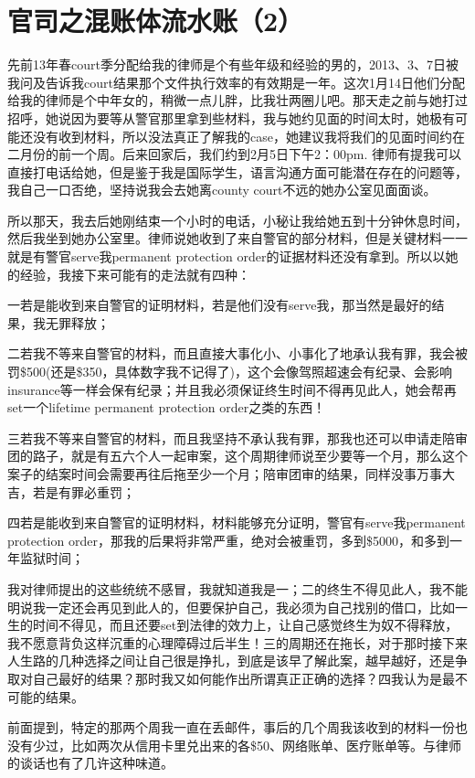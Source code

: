 \documentclass[12pt]{book}
\begin{document}
\section{官司之混账体流水账（2）}
\label{sec-40-2}
先前13年春court季分配给我的律师是个有些年级和经验的男的，2013、3、7日被我问及告诉我court结果那个文件执行效率的有效期是一年。这次1月14日他们分配给我的律师是个中年女的，稍微一点儿胖，比我壮两圈儿吧。那天走之前与她打过招呼，她说因为要等从警官那里拿到些材料，我与她约见面的时间太时，她极有可能还没有收到材料，所以没法真正了解我的case，她建议我将我们的见面时间约在二月份的前一个周。后来回家后，我们约到2月5日下午2：00pm. 律师有提我可以直接打电话给她，但是鉴于我是国际学生，语言沟通方面可能潜在存在的问题等，我自己一口否绝，坚持说我会去她离county court不远的她办公室见面面谈。　

所以那天，我去后她刚结束一个小时的电话，小秘让我给她五到十分钟休息时间，然后我坐到她办公室里。律师说她收到了来自警官的部分材料，但是关键材料一一就是有警官serve我permanent protection order的证据材料还没有拿到。所以以她的经验，我接下来可能有的走法就有四种：

一若是能收到来自警官的证明材料，若是他们没有serve我，那当然是最好的结果，我无罪释放；

二若我不等来自警官的材料，而且直接大事化小、小事化了地承认我有罪，我会被罚\$500(还是\$350，具体数字我不记得了)，这个会像驾照超速会有纪录、会影响insurance等一样会保有纪录；并且我必须保证终生时间不得再见此人，她会帮再set一个lifetime permanent protection order之类的东西！

三若我不等来自警官的材料，而且我坚持不承认我有罪，那我也还可以申请走陪审团的路子，就是有五六个人一起审案，这个周期律师说至少要等一个月，那么这个案子的结案时间会需要再往后拖至少一个月；陪审团审的结果，同样没事万事大吉，若是有罪必重罚；

四若是能收到来自警官的证明材料，材料能够充分证明，警官有serve我permanent protection order，那我的后果将非常严重，绝对会被重罚，多到\$5000，和多到一年监狱时间；

我对律师提出的这些统统不感冒，我就知道我是一；二的终生不得见此人，我不能明说我一定还会再见到此人的，但要保护自己，我必须为自己找别的借口，比如一生的时间不得见，而且还要set到法律的效力上，让自己感觉终生为奴不得释放，我不愿意背负这样沉重的心理障碍过后半生！三的周期还在拖长，对于那时接下来人生路的几种选择之间让自己很是挣扎，到底是该早了解此案，越早越好，还是争取对自己最好的结果？那时我又如何能作出所谓真正正确的选择？四我认为是最不可能的结果。

前面提到，特定的那两个周我一直在丢邮件，事后的几个周我该收到的材料一份也没有少过，比如两次从信用卡里兑出来的各\$50、网络账单、医疗账单等。与律师的谈话也有了几许这种味道。
\end{document}
